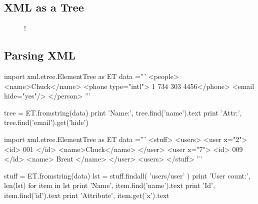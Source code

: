 \documentclass[a4paper,12pt]{report}
\begin{document}
\subsection{XML as a Tree}
\begin{figure}[H]
  \centering
        \resizebox {2.4in} {!} {
}
\end{figure}

\subsection{Parsing XML}
\begin{tcolorbox}
\begin{python}
import xml.etree.ElementTree as ET
data ='''
	<people>
		<name>Chuck</name>
		<phone type="intl"> 1 734 303 4456</phone>
		<email hide="yes"/>
	</person> '''

tree = ET.fromstring(data)
print 'Name:', tree.find('name').text %
print 'Attr:', tree.find('email').get('hide') %
\end{python}
\end{tcolorbox}

\begin{tcolorbox}
\begin{python}
import xml.etree.ElementTree as ET
data ='''
<stuff>
	<users>
		<user x="2">
			<id> 001 </id>
			<name>Chuck</name>
		</user>
		<user x="7">
			<id> 009 </id>
			<name> Brent </name>
		</user>
	<users>
</stuff> '''

stuff = ET.fromstring(data)
lst = stuff.findall( 'users/user' )
print 'User count:', len(lst)
for item in lst
	print 'Name', item.find('name').text
	print 'Id', item.find('id').text
	print 'Attribute', item.get('x').text
\end{python}
\end{tcolorbox}
\end{document}
